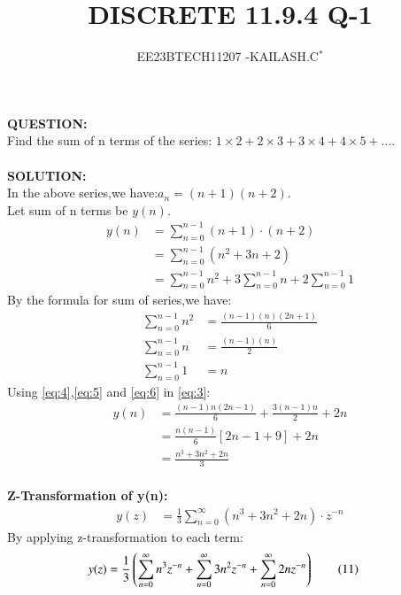 \documentclass[journal,12pt,twocolumn]{IEEEtran}
\theoremstyle{remark}
\begin{document}

\vspace{3cm}

\title{DISCRETE 11.9.4 Q-1}
\author{EE23BTECH11207 -KAILASH.C$^{*}$%
}
\maketitle
\newpage
\bigskip

\renewcommand{\thefigure}{\theenumi}
\renewcommand{\thetable}{\theenumi}


\textbf{QUESTION:}\\
Find the sum of n terms of the series:
$1\times2+2\times3+3\times4+4\times5+....$\\ \\
\textbf{SOLUTION:}\\
In the above series,we have:$a_n=(n+1)(n+2)$.\\
Let sum of n terms be $y(n)$.
\begin{align}
y(n)&=\sum_{n=0}^{n-1} (n+1) \cdot (n+2)\label{eq:1}\tag{1}\\
     &=\sum_{n=0}^{n-1} (n^2 + 3n + 2)\label{eq:2}\tag{2}\\
     &=\sum_{n=0}^{n-1} n^2+3\sum_{n=0}^{n-1} n+2 \sum_{n=0}^{n-1} 1\label{eq:3}\tag{3}
\end{align}
By the formula for sum of series,we have:
\begin{align}
    \sum_{n=0}^{n-1} n^2&=\frac{(n-1)(n)(2n+1)}{6}\label{eq:4}\tag{4} \\
    \sum_{n=0}^{n-1} n&=\frac{(n-1)(n)}{2} \label{eq:5}\tag{5} \\
    \sum_{n=0}^{n-1} 1&=n \label{eq:6}\tag{6}
\end{align}
Using \eqref{eq:4},\eqref{eq:5} and \eqref{eq:6} in \eqref{eq:3}:
\begin{align}
y(n)&=\frac{(n-1)n(2n-1)}{6} + \frac{3(n-1)n}{2} + 2n \label{eq:7}\tag{7} \\
    &=\frac{n(n-1)}{6}[2n-1+9]+2n \label{eq:8}\tag{8}\\
    &=\frac{n^3+3n^2+2n}{3}\label{eq:9}\tag{9}
\end{align}\\
\textbf{Z-Transformation of y(n):}\\
\begin{align}
y(z)&=\frac{1}{3} \sum_{n=0}^{\infty} (n^3 + 3n^2 + 2n) \cdot z^{-n}\label{eq:10}\tag{10}
\end{align}
By applying z-transformation to each term:
\begin{align}
    y(z)&=\frac{1}{3}\left(\sum_{n=0}^{\infty}n^3 z^{-n}+\sum_{n=0}^{\infty}3n^2z^{-n}+\sum_{n=0}^{\infty}2nz^{-n}\right) \label{eq:11}\tag{11}
\end{align}
\end{document}
